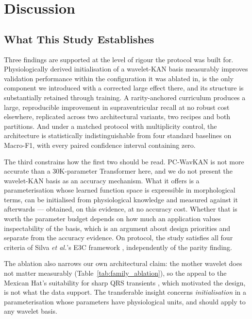 \documentclass[journal,twoside,web]{ieeecolor}
\begin{document}
\section{Discussion}
\label{sec:discussion}

\subsection{What This Study Establishes}
Three findings are supported at the level of rigour the protocol was built for. Physiologically derived initialisation of a wavelet-KAN basis measurably improves validation performance within the configuration it was ablated in, is the only component we introduced with a corrected large effect there, and its structure is substantially retained through training. A rarity-anchored curriculum produces a large, reproducible improvement in supraventricular recall at no robust cost elsewhere, replicated across two architectural variants, two recipes and both partitions. And under a matched protocol with multiplicity control, the architecture is statistically indistinguishable from four standard baselines on Macro-F1, with every paired confidence interval containing zero.

The third constrains how the first two should be read. PC-WavKAN is not more accurate than a 30K-parameter Transformer here, and we do not present the wavelet-KAN basis as an accuracy mechanism. What it offers is a parameterisation whose learned function space is expressible in morphological terms, can be initialised from physiological knowledge and measured against it afterwards --- obtained, on this evidence, at no accuracy cost. Whether that is worth the parameter budget depends on how much an application values inspectability of the basis, which is an argument about design priorities and separate from the accuracy evidence. On protocol, the study satisfies all four criteria of Silva \emph{et al.}'s E3C framework \cite{silva_systematic_2025}, independently of the parity finding.

The ablation also narrows our own architectural claim: the mother wavelet does not matter measurably (Table~\ref{tab:family_ablation}), so the appeal to the Mexican Hat's suitability for sharp QRS transients \cite{addison_wavelet_2005}, which motivated the design, is not what the data support. The transferable insight concerns \emph{initialisation} in a parameterisation whose parameters have physiological units, and should apply to any wavelet basis.
\end{document}
